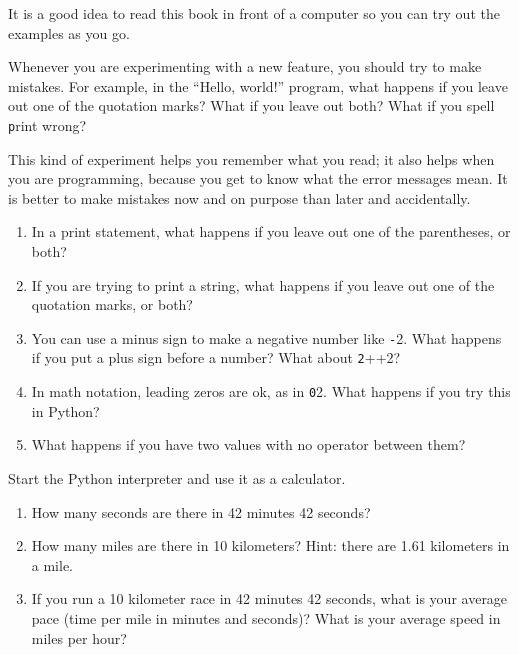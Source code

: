 \documentclass[
DIV=11,
fontsize=13,
twoside,
headinclude=false,
titlepage=firstiscover,
abstract=true,
headsepline=true,
footsepline=true,
chapterprefix=true, %
headings=big,
bibliography=totoc,%
captions=tableheading
]{scrbook}
\theoremstyle{definition}
\begin{document}
\begin{exercise}
\normalfont
\normalfont

It is a good idea to read this book in front of a computer so you can
try out the examples as you go.

Whenever you are experimenting with a new feature, you should try
to make mistakes.  For example, in the ``Hello, world!'' program,
what happens if you leave out one of the quotation marks?  What
if you leave out both?  What if you spell {\texttt print} wrong?

This kind of experiment helps you remember what you read; it also
helps when you are programming, because you get to know what the error
messages mean.  It is better to make mistakes now and on purpose than
later and accidentally.

\begin{enumerate}

\item In a print statement, what happens if you leave out one
of the parentheses, or both?

\item If you are trying to print a string, what happens if you
leave out one of the quotation marks, or both?

\item You can use a minus sign to make a negative number like
{\texttt -2}.  What happens if you put a plus sign before a number?
What about {\texttt 2++2}?

\item In math notation, leading zeros are ok, as in {\texttt 02}.
What happens if you try this in Python?

\item What happens if you have two values with no operator
between them?

\end{enumerate}

\end{exercise}



\begin{exercise}
\normalfont
\normalfont

Start the Python interpreter and use it as a calculator.

\begin{enumerate}

\item How many seconds are there in 42 minutes 42 seconds?

\item How many miles are there in 10 kilometers?  Hint: there are 1.61
  kilometers in a mile.

\item If you run a 10 kilometer race in 42 minutes 42 seconds, what is
  your average pace (time per mile in minutes and seconds)?  What is
  your average speed in miles per hour?


\end{enumerate}

\end{exercise}
\end{document}
